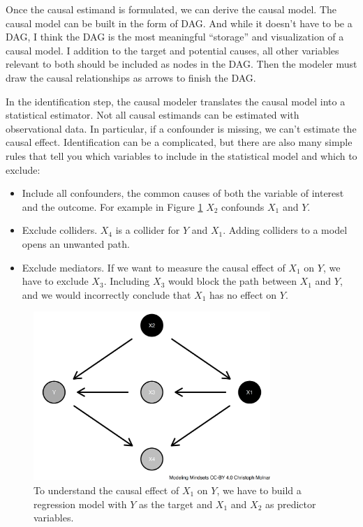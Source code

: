 \documentclass[
  10pt,
]{scrbook}
\providecommand{\tightlist}{%
  \setlength{\itemsep}{0pt}\setlength{\parskip}{0pt}}
\begin{document}
Once the causal estimand is formulated, we can derive the causal model.
The causal model can be built in the form of DAG.
And while it doesn't have to be a DAG, I think the DAG is the most meaningful ``storage'' and visualization of a causal model.
I addition to the target and potential causes, all other variables relevant to both should be included as nodes in the DAG.
Then the modeler must draw the causal relationships as arrows to finish the DAG.

In the identification step, the causal modeler translates the causal model into a statistical estimator.
Not all causal estimands can be estimated with observational data.
In particular, if a confounder is missing, we can't estimate the causal effect.
Identification can be a complicated, but there are also many simple rules that tell you which variables to include in the statistical model and which to exclude:

\begin{itemize}
\tightlist
\item
  Include all confounders, the common causes of both the variable of interest and the outcome. For example in Figure \ref{fig:dag-rules} \(X_2\) confounds \(X_1\) and \(Y\).
\item
  Exclude colliders. \(X_4\) is a collider for \(Y\) and \(X_1\). Adding colliders to a model opens an unwanted path.
\item
  Exclude mediators. If we want to measure the causal effect of \(X_1\) on \(Y\), we have to exclude \(X_3\). Including \(X_3\) would block the path between \(X_1\) and \(Y\), and we would incorrectly conclude that \(X_1\) has no effect on \(Y\).
\end{itemize}

\begin{figure}

{\centering \includegraphics[width=0.8\textwidth]{figures/dag-rules-1} 

}

\caption{To understand the causal effect of $X_1$ on $Y$, we have to build a regression model with $Y$ as the target and $X_1$ and $X_2$ as predictor variables.}\label{fig:dag-rules}
\end{figure}
\end{document}
